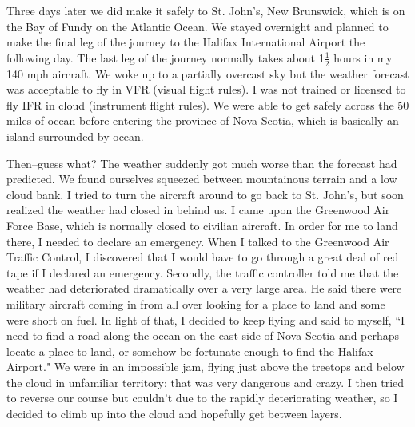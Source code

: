 \documentclass[oneside,12pt]{book}
\begin{document}
Three days later we did make it safely to St. John's, New Brunswick, which is on the Bay of Fundy on the Atlantic Ocean. We stayed overnight and planned to make the final leg of the journey to the Halifax International Airport the following day. The last leg of the journey normally takes about 1$\frac{1}{2}$ hours in my 140 mph aircraft. We woke up to a partially overcast sky but the weather forecast was acceptable to fly in VFR (visual flight rules). I was not trained or licensed to fly IFR in cloud (instrument flight rules). We were able to get safely across the 50 miles of ocean before entering the province of Nova Scotia, which is basically an island surrounded by ocean. 

Then--guess what? The weather suddenly got much worse than the forecast had predicted. We found ourselves squeezed between mountainous terrain and a low cloud bank. I tried to turn the aircraft around to go back to St. John's, but soon realized the weather had closed in behind us. I  came upon the Greenwood Air Force Base, which is normally closed to civilian aircraft. In order for me to land there, I needed to declare an emergency. When I talked to the Greenwood Air Traffic Control, I discovered that I would have to go through a great deal of red tape if I declared an emergency. Secondly, the traffic controller told me that the weather had deteriorated dramatically over a very large area. He said there were military aircraft coming in from all over looking for a place to land and some were short on fuel. In light of that, I decided to keep flying and said to myself, ``I need to find a road along the ocean on the east side of Nova Scotia and perhaps locate a place to land, or somehow be fortunate enough to find the Halifax Airport." We were in an impossible jam, flying just above the treetops and below the cloud in unfamiliar territory; that was very dangerous and crazy. I then tried to reverse our course but couldn't due to the rapidly deteriorating weather, so I decided to climb up into the cloud and hopefully get between layers. 
\end{document}
